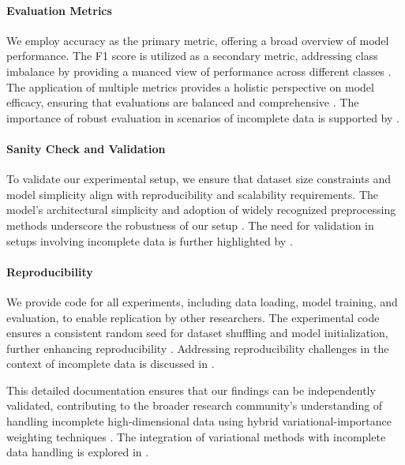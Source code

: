 \documentclass{article} %
\begin{document}
\paragraph{Evaluation Metrics} We employ accuracy as the primary metric, offering a broad overview of model performance. The F1 score is utilized as a secondary metric, addressing class imbalance by providing a nuanced view of performance across different classes \citep{robust2023,flexible2023}. The application of multiple metrics provides a holistic perspective on model efficacy, ensuring that evaluations are balanced and comprehensive \citep{a2023}. The importance of robust evaluation in scenarios of incomplete data is supported by \citep{survival2022,supervised2018,evaluating2023}.

\paragraph{Sanity Check and Validation} To validate our experimental setup, we ensure that dataset size constraints and model simplicity align with reproducibility and scalability requirements. The model's architectural simplicity and adoption of widely recognized preprocessing methods underscore the robustness of our setup \citep{lux2025}. The need for validation in setups involving incomplete data is further highlighted by \citep{quantum2013,fast2010}.

\paragraph{Reproducibility} We provide code for all experiments, including data loading, model training, and evaluation, to enable replication by other researchers. The experimental code ensures a consistent random seed for dataset shuffling and model initialization, further enhancing reproducibility \citep{mixfean2024,gaussian2024,bootstrap2024}. Addressing reproducibility challenges in the context of incomplete data is discussed in \citep{learned2020,mixed2014}.

This detailed documentation ensures that our findings can be independently validated, contributing to the broader research community's understanding of handling incomplete high-dimensional data using hybrid variational-importance weighting techniques \citep{massively2025,nonlinear2024,annealed2019}. The integration of variational methods with incomplete data handling is explored in \citep{variational2021,variational2021,explicit2024}.
\end{document}
